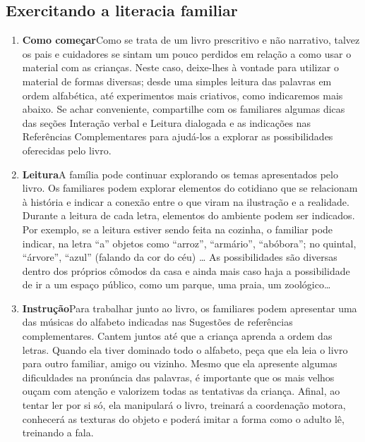 \documentclass[11pt]{extarticle}
\begin{document}
\subsection{Exercitando a literacia familiar}


\begin{enumerate}
\item \textbf{Como começar}\quad Como se trata de um livro
prescritivo e não narrativo, talvez os pais e cuidadores
se sintam um pouco perdidos em relação a como usar o material
com as crianças. Neste caso, deixe-lhes à vontade para 
utilizar o material de formas diversas; desde uma simples leitura
das palavras em ordem alfabética, até experimentos mais criativos,
como indicaremos mais abaixo. Se achar conveniente, compartilhe com 
os familiares algumas dicas das seções Interação verbal 
e Leitura dialogada e as indicações nas Referências Complementares 
para ajudá-los a explorar as possibilidades oferecidas pelo livro. 

\item \textbf{Leitura}\quad A família pode continuar 
explorando os temas apresentados pelo livro. Os familiares podem explorar 
elementos do cotidiano que se relacionam à história e indicar a conexão 
entre o que viram na ilustração e a realidade. Durante a leitura 
de cada letra, elementos do ambiente podem ser indicados. Por exemplo,
se a leitura estiver sendo feita na cozinha, o familiar pode indicar,
na letra ``a'' objetos como ``arroz'', ``armário'', ``abóbora''; no
quintal, ``árvore'', ``azul'' (falando da cor do céu) \dots{} As possibilidades
são diversas dentro dos próprios cômodos da casa e ainda mais
caso haja a possibilidade de ir a um espaço público, como um parque,
uma praia, um zoológico\dots{}

\item \textbf{Instrução}\quad Para trabalhar junto ao livro,
os familiares podem apresentar uma das músicas do alfabeto
indicadas nas Sugestões de referências complementares.
Cantem juntos até que a criança aprenda a ordem das letras.
Quando ela tiver dominado todo o alfabeto, peça que ela leia
o livro para outro familiar, amigo ou vizinho. Mesmo que ela
apresente algumas dificuldades na pronúncia das palavras, é importante 
que os mais velhos ouçam com atenção e valorizem todas as tentativas 
da criança. Afinal, ao tentar ler por si só, ela manipulará o livro, 
treinará a coordenação motora, conhecerá as texturas do objeto e
poderá imitar a forma como o adulto lê, treinando a fala. 
\end{enumerate}
\end{document}
